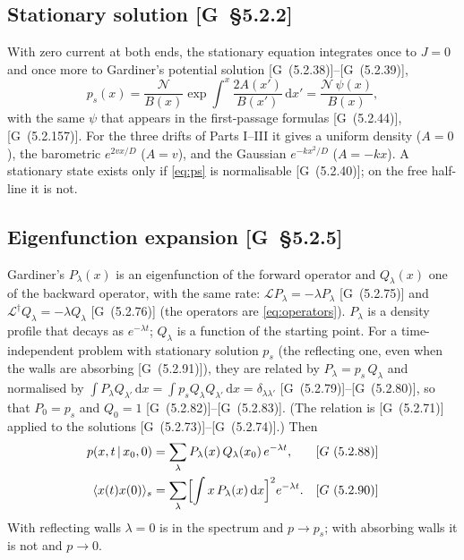 \documentclass[11pt]{article}
\numberwithin{equation}{section}
\newcommand{\dd}{\mathrm{d}}
\newcommand{\avg}[1]{\langle #1\rangle}
\newcommand{\given}{\,|\,}
\newcommand{\G}[1]{[G~(#1)]}
\newcommand{\Gs}[1]{[G~\S#1]}
\begin{document}
\subsection{Stationary solution \texorpdfstring{\Gs{5.2.2}}{}}
\label{sec:stationary}

With zero current at both ends, the stationary equation integrates once to $J=0$ and once more to
Gardiner's potential solution \G{5.2.38}--\G{5.2.39},
\begin{equation}
  p_s(x)=\frac{\mathcal N}{B(x)}\exp\int^x\frac{2A(x')}{B(x')}\,\dd x'=\frac{\mathcal N\,\psi(x)}{B(x)},
  \label{eq:ps}
\end{equation}
with the same $\psi$ that appears in the first-passage formulas \G{5.2.44}, \G{5.2.157}. For the three drifts
of Parts I--III it gives a uniform density ($A=0$), the barometric $e^{2vx/D}$ ($A=v$), and the Gaussian
$e^{-kx^2/D}$ ($A=-kx$). A stationary state exists only if \cref{eq:ps} is normalisable \G{5.2.40}; on the
free half-line it is not.

\subsection{Eigenfunction expansion \texorpdfstring{\Gs{5.2.5}}{}}
\label{sec:eigen}

Gardiner's $P_\lambda(x)$ is an eigenfunction of the forward operator and $Q_\lambda(x)$ one of the backward
operator, with the same rate: $\mathcal LP_\lambda=-\lambda P_\lambda$ \G{5.2.75} and
$\mathcal L^\dagger Q_\lambda=-\lambda Q_\lambda$ \G{5.2.76} (the operators are \cref{eq:operators}). $P_\lambda$
is a density profile that decays as $e^{-\lambda t}$; $Q_\lambda$ is a function of the starting point. For a
time-independent problem with stationary solution $p_s$ (the reflecting one, even when the walls are absorbing
\G{5.2.91}), they are related by $P_\lambda = p_s\,Q_\lambda$ and normalised by
$\int P_\lambda Q_{\lambda'}\,\dd x=\int p_sQ_\lambda Q_{\lambda'}\,\dd x=\delta_{\lambda\lambda'}$
\G{5.2.79}--\G{5.2.80}, so that $P_0=p_s$ and $Q_0=1$ \G{5.2.82}--\G{5.2.83}. (The relation is \G{5.2.71} applied
to the solutions \G{5.2.73}--\G{5.2.74}.) Then
\begin{align}
  p(x,t\given x_0,0) &= \sum_\lambda P_\lambda(x)\,Q_\lambda(x_0)\,e^{-\lambda t}, && \G{5.2.88}\\
  \avg{x(t)x(0)}_s &= \sum_\lambda \Bigl[\int x\,P_\lambda(x)\,\dd x\Bigr]^2 e^{-\lambda t}. && \G{5.2.90}
\end{align}
With reflecting walls $\lambda=0$ is in the spectrum and $p\to p_s$; with absorbing walls it is not and
$p\to0$.
\end{document}
